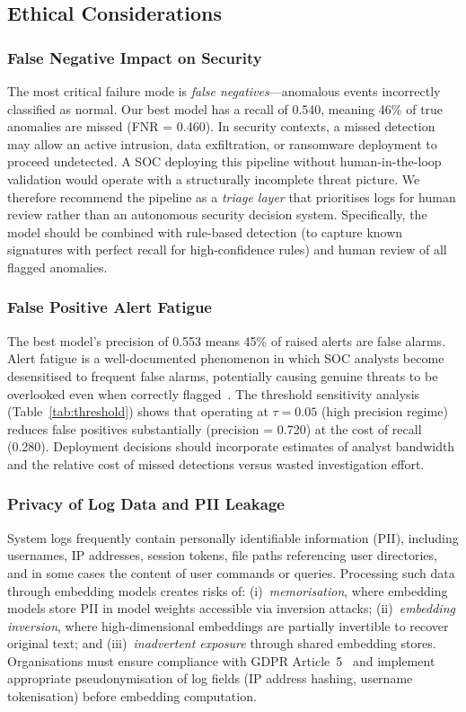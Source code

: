 \documentclass[conference]{IEEEtran}
\begin{document}
\subsection{Ethical Considerations}
\label{sec:ethics}

\subsubsection{False Negative Impact on Security}
The most critical failure mode is \emph{false negatives}---anomalous events
incorrectly classified as normal.  Our best model has a recall of 0.540,
meaning 46\% of true anomalies are missed (FNR = 0.460).  In security
contexts, a missed detection may allow an active intrusion, data
exfiltration, or ransomware deployment to proceed undetected.  A SOC
deploying this pipeline without human-in-the-loop validation would operate
with a structurally incomplete threat picture.  We therefore recommend the
pipeline as a \emph{triage layer} that prioritises logs for human review
rather than an autonomous security decision system.  Specifically, the model
should be combined with rule-based detection (to capture known signatures
with perfect recall for high-confidence rules) and human review of all
flagged anomalies.

\subsubsection{False Positive Alert Fatigue}
The best model's precision of 0.553 means 45\% of raised alerts are false
alarms.  Alert fatigue is a well-documented phenomenon in which SOC analysts
become desensitised to frequent false alarms, potentially causing genuine
threats to be overlooked even when correctly flagged~\cite{shen2018}.  The
threshold sensitivity analysis (Table~\ref{tab:threshold}) shows that
operating at $\tau = 0.05$ (high precision regime) reduces false positives
substantially (precision = 0.720) at the cost of recall (0.280).  Deployment
decisions should incorporate estimates of analyst bandwidth and the relative
cost of missed detections versus wasted investigation effort.

\subsubsection{Privacy of Log Data and PII Leakage}
System logs frequently contain personally identifiable information (PII),
including usernames, IP addresses, session tokens, file paths referencing
user directories, and in some cases the content of user commands or queries.
Processing such data through embedding models creates risks of:
(i)~\emph{memorisation}, where embedding models store PII in model weights
accessible via inversion attacks; (ii)~\emph{embedding inversion}, where
high-dimensional embeddings are partially invertible to recover original
text; and (iii)~\emph{inadvertent exposure} through shared embedding stores.
Organisations must ensure compliance with GDPR Article~5~\cite{gdpr2016}
and implement appropriate pseudonymisation of log fields (IP address hashing,
username tokenisation) before embedding computation.
\end{document}
